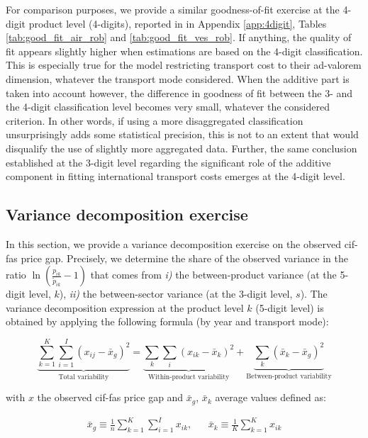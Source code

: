 \documentclass[a4paper,11pt]{article}
\begin{document}
For comparison purposes, we provide a similar goodness-of-fit exercise at the 4-digit product level (4-digits), reported in in Appendix \ref{app:4digit}, Tables \ref{tab:good_fit_air_rob} and \ref{tab:good_fit_ves_rob}. If anything, the quality of fit appears slightly higher when estimations are based on the 4-digit classification. This is especially true for the model restricting transport cost to their ad-valorem dimension, whatever the transport mode considered. When the additive part is taken into account however, the difference in goodness of fit between the 3- and the 4-digit classification level becomes very small, whatever the considered criterion. In other words, if using a more disaggregated classification unsurprisingly adds some statistical precision, this is not to an extent that would disqualify the use of slightly more aggregated data. Further, the same conclusion established at the 3-digit level regarding the significant role of the additive component in fitting international transport costs emerges at the 4-digit level.



\subsection{Variance decomposition exercise \label{app:decomp_variance}}

In this section, we provide a variance decomposition exercise on the observed cif-fas price gap. Precisely, we determine the share of the observed variance in the ratio $\ln(\frac{p_{ik}}{\widetilde{p}_{ik}}-1)$ that comes from \textit{i)} the between-product variance (at the 5-digit level, $k$), \textit{ii)} the between-sector variance (at the 3-digit level, $s$). The variance decomposition expression at the product level $k$ (5-digit level) is obtained by applying the following formula (by year and transport mode):

$$\underbrace{\sum_{k=1}^K \sum_{i=1}^I \left(x_{ij} - \bar{x}_g  \right)^2}_{\text{Total variability}} = \underbrace{\sum_k \sum_i \left(x_{ik} - \bar{x}_k  \right)^2}_{\text{Within-product variability}} + \underbrace{\sum_k \left(\bar{x}_{k} - \bar{x}_g  \right)^2}_{\text{Between-product variability}}$$

with $x$ the observed cif-fas price gap and $\bar{x}_g$, $\bar{x}_k$ average values defined as:

\begin{eqnarray*}
\bar{x}_g \equiv \frac{1}{n} \sum_{k=1}^K \sum_{i=1}^I x_{ik},&& \bar{x}_k \equiv \frac{1}{K}\sum_{k=1}^K x_{ik}
\end{eqnarray*}
\end{document}
